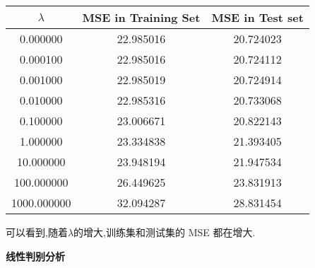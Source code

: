 \documentclass[answers]{exam}  %
\begin{document}
\begin{questions}
\begin{solution}
\begin{description}
			      \begin{center}
				      \begin{tabular}{c|c|c}
					      \hline
					      $\lambda$   & MSE in Training Set & MSE in Test set \\
					      \hline\hline
					      0.000000    & 22.985016           & 20.724023       \\
					      \hline
					      0.000100    & 22.985016           & 20.724112       \\
					      \hline
					      0.001000    & 22.985019           & 20.724914       \\
					      \hline
					      0.010000    & 22.985316           & 20.733068       \\
					      \hline
					      0.100000    & 23.006671           & 20.822143       \\
					      \hline
					      1.000000    & 23.334838           & 21.393405       \\
					      \hline
					      10.000000   & 23.948194           & 21.947534       \\
					      \hline
					      100.000000  & 26.449625           & 23.831913       \\
					      \hline
					      1000.000000 & 32.094287           & 28.831454       \\
					      \hline
				      \end{tabular}
			      \end{center}


			      可以看到,随着$\lambda$的增大,训练集和测试集的 MSE 都在增大.
		\end{description}
	\end{solution}

	\question [20] \textbf{线性判别分析}


\end{questions}
\end{document}
